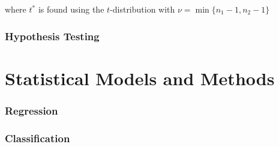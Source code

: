 \documentclass{article}
\begin{document}
\noindent
where $t^*$ is found using the $t$-distribution with $\nu = \min\{n_1 - 1, n_2 - 1\}$

\section{Hypothesis Testing}

\newpage
\part{Statistical Models and Methods}
\section{Regression}
\section{Classification}

    
\end{document}
